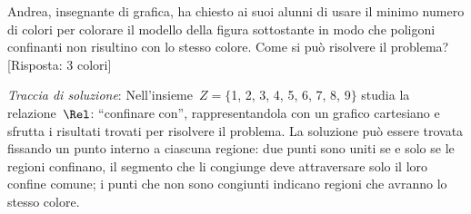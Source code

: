 \begin{esercizio}
\label{ese:\thechapter.51}
Andrea, insegnante di grafica, ha chiesto ai suoi alunni di usare il minimo numero di colori per colorare il modello della figura %
sottostante in modo che poligoni confinanti non risultino con lo stesso colore. Come si può risolvere il problema? [Risposta: 3 colori]

\emph{Traccia di soluzione}: Nell'insieme~$Z =\{$1, 2, 3, 4, 5, 6, 7, 8, 9$\}$ studia la relazione~$\Rel$: ``confinare con'', rappresentandola con un grafico cartesiano e sfrutta
i risultati trovati per risolvere il problema.
La soluzione può essere trovata fissando un punto interno a ciascuna regione: due punti sono uniti se e solo se le regioni confinano, il segmento che li congiunge
deve attraversare solo il loro confine comune; i punti che non sono congiunti indicano regioni che avranno lo stesso colore.
\begin{center}
 
\end{center}
\end{esercizio}

